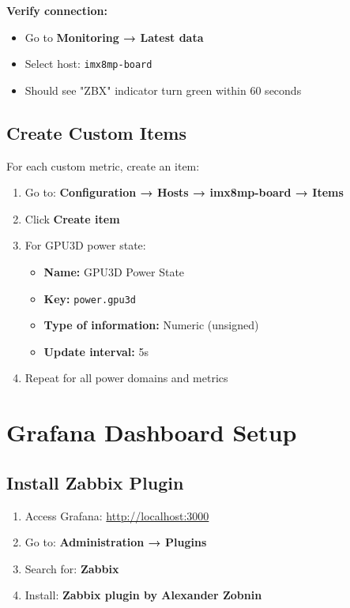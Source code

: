 \documentclass[12pt,a4paper]{report}
\begin{document}
\textbf{Verify connection:}
\begin{itemize}
    \item Go to \textbf{Monitoring → Latest data}
    \item Select host: \texttt{imx8mp-board}
    \item Should see "ZBX" indicator turn green within 60 seconds
\end{itemize}

\subsection{Create Custom Items}

For each custom metric, create an item:

\begin{enumerate}
    \item Go to: \textbf{Configuration → Hosts → imx8mp-board → Items}
    \item Click \textbf{Create item}
    \item For GPU3D power state:
    \begin{itemize}
        \item \textbf{Name:} GPU3D Power State
        \item \textbf{Key:} \texttt{power.gpu3d}
        \item \textbf{Type of information:} Numeric (unsigned)
        \item \textbf{Update interval:} 5s
    \end{itemize}
    \item Repeat for all power domains and metrics
\end{enumerate}


\section{Grafana Dashboard Setup}

\subsection{Install Zabbix Plugin}

\begin{enumerate}
    \item Access Grafana: \url{http://localhost:3000}
    \item Go to: \textbf{Administration → Plugins}
    \item Search for: \textbf{Zabbix}
    \item Install: \textbf{Zabbix plugin by Alexander Zobnin}
\end{enumerate}
\end{document}
